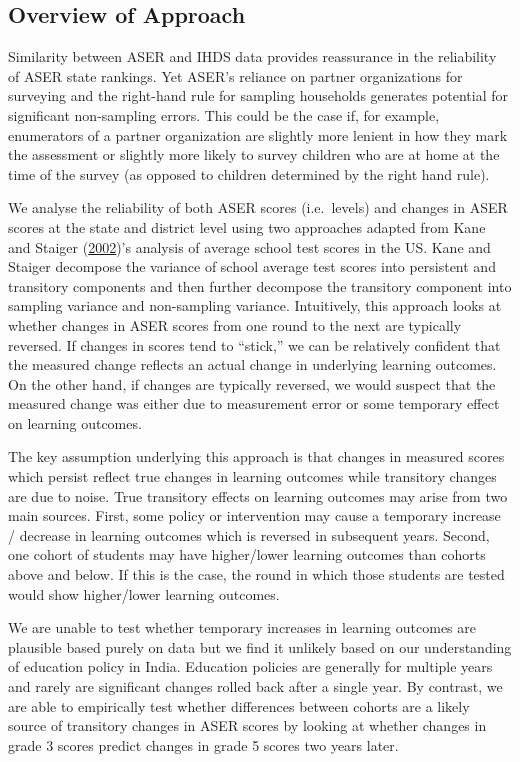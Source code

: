 \documentclass[
  11pt,
]{article}
\begin{document}
\hypertarget{overview-of-approach}{%
\subsection{Overview of Approach}\label{overview-of-approach}}

Similarity between ASER and IHDS data provides reassurance in the reliability of ASER state rankings. Yet ASER's reliance on partner organizations for surveying and the right-hand rule for sampling households generates potential for significant non-sampling errors. This could be the case if, for example, enumerators of a partner organization are slightly more lenient in how they mark the assessment or slightly more likely to survey children who are at home at the time of the survey (as opposed to children determined by the right hand rule).

We analyse the reliability of both ASER scores (i.e.~levels) and changes in ASER scores at the state and district level using two approaches adapted from Kane and Staiger (\protect\hyperlink{ref-kane2002promise}{2002})'s analysis of average school test scores in the US. Kane and Staiger decompose the variance of school average test scores into persistent and transitory components and then further decompose the transitory component into sampling variance and non-sampling variance. Intuitively, this approach looks at whether changes in ASER scores from one round to the next are typically reversed. If changes in scores tend to ``stick,'' we can be relatively confident that the measured change reflects an actual change in underlying learning outcomes. On the other hand, if changes are typically reversed, we would suspect that the measured change was either due to measurement error or some temporary effect on learning outcomes.

The key assumption underlying this approach is that changes in measured scores which persist reflect true changes in learning outcomes while transitory changes are due to noise. True transitory effects on learning outcomes may arise from two main sources. First, some policy or intervention may cause a temporary increase / decrease in learning outcomes which is reversed in subsequent years. Second, one cohort of students may have higher/lower learning outcomes than cohorts above and below. If this is the case, the round in which those students are tested would show higher/lower learning outcomes.

We are unable to test whether temporary increases in learning outcomes are plausible based purely on data but we find it unlikely based on our understanding of education policy in India. Education policies are generally for multiple years and rarely are significant changes rolled back after a single year. By contrast, we are able to empirically test whether differences between cohorts are a likely source of transitory changes in ASER scores by looking at whether changes in grade 3 scores predict changes in grade 5 scores two years later.
\end{document}
